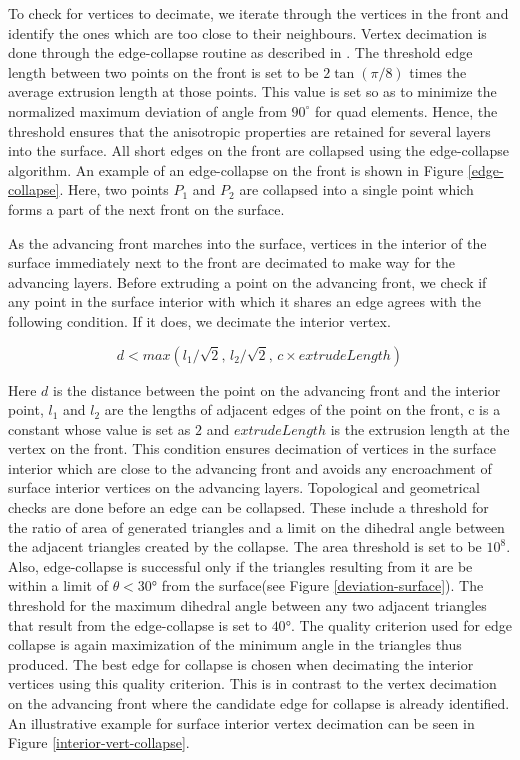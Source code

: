 \documentclass[conf]{new-aiaa}
\begin{document}
To check for vertices to decimate, we iterate through the vertices in the front and identify the ones which are too close to their neighbours. Vertex decimation is done through the edge-collapse routine as described in \cite{hoppe1994mesh}. The threshold edge length between two points on the front is set to be $2 \tan(\pi/8)$ times the average extrusion length at those points. This value is set so as to minimize the normalized maximum deviation of angle from $90^\circ$ for quad elements. Hence, the threshold ensures that the anisotropic properties are retained for several layers into the surface. All short edges on the front are collapsed using the edge-collapse algorithm. An example of an edge-collapse on the front is shown in Figure \ref{edge-collapse}. Here, two points $P_1$ and $P_2$ are collapsed into a single point which forms a part of the next front on the surface.

As the advancing front marches into the surface, vertices in the interior of the surface immediately next to the front are decimated to make way for the advancing layers. Before extruding a point on the advancing front, we check if any point in the surface interior with which it shares an edge agrees with the following condition. If it does, we decimate the interior vertex.

\begin{equation}
    d < max \left(l_{1}/\sqrt{2}, \, l_{2}/\sqrt{2}, \, c\times \mathit{extrudeLength}\right)
    \label{collapse-eq}
\end{equation}

Here $d$ is the distance between the point on the advancing front and the interior point, $l_1$ and $l_2$ are the lengths of adjacent edges of the point on the front, c is a constant whose value is set as $2$ and $extrudeLength$ is the extrusion length at the vertex on the front. This condition ensures decimation of vertices in the surface interior which are close to the advancing front and avoids any encroachment of surface interior vertices on the advancing layers. Topological and geometrical checks are done before an edge can be collapsed. These include a threshold for the ratio of area of generated triangles and a limit on the dihedral angle between the adjacent triangles created by the collapse. The area threshold is set to be $10^8$. Also, edge-collapse is successful only if the triangles resulting from it are be within a limit of $\theta < \ang{30}$ from the surface(see Figure \ref{deviation-surface}). The threshold for the maximum dihedral angle between any two adjacent triangles that result from the edge-collapse is set to $\ang{40}$. The quality criterion used for edge collapse is again maximization of the minimum angle in the triangles thus produced. The best edge for collapse is chosen when decimating the interior vertices using this quality criterion. This is in contrast to the vertex decimation on the advancing front where the candidate edge for collapse is already identified. An illustrative example for surface interior vertex decimation can be seen in Figure \ref{interior-vert-collapse}.
\end{document}
